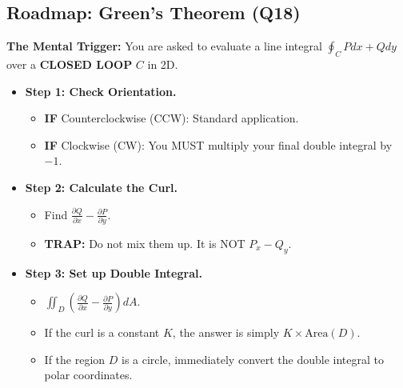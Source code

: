 \documentclass[11pt]{article}
\begin{document}
\subsection{Roadmap: Green's Theorem (Q18)}
\textbf{The Mental Trigger:} You are asked to evaluate a line integral $\oint_C P dx + Q dy$ over a \textbf{CLOSED LOOP} $C$ in 2D.
\begin{itemize}
    \item \textbf{Step 1: Check Orientation.}
    \begin{itemize}
        \item \textbf{IF} Counterclockwise (CCW): Standard application.
        \item \textbf{IF} Clockwise (CW): You MUST multiply your final double integral by $-1$.
    \end{itemize}
    \item \textbf{Step 2: Calculate the Curl.}
    \begin{itemize}
        \item Find $\frac{\partial Q}{\partial x} - \frac{\partial P}{\partial y}$.
        \item \textbf{TRAP:} Do not mix them up. It is NOT $P_x - Q_y$. 
    \end{itemize}
    \item \textbf{Step 3: Set up Double Integral.}
    \begin{itemize}
        \item $\iint_D (\frac{\partial Q}{\partial x} - \frac{\partial P}{\partial y}) dA$.
        \item If the curl is a constant $K$, the answer is simply $K \times \text{Area}(D)$.
        \item If the region $D$ is a circle, immediately convert the double integral to polar coordinates.
    \end{itemize}
\end{itemize}
\end{document}
